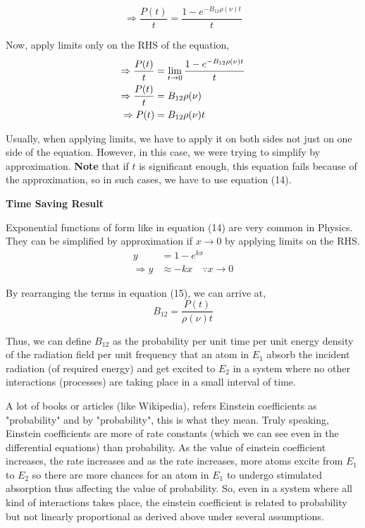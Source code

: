 \documentclass[12pt]{article}
\begin{document}
\begin{equation*}
    \Rightarrow \frac{P(t)}{t} = \frac{1 - e^{-B_{12}\rho(\nu)t}}{t}
\end{equation*} \vspace{.05cm}

Now, apply limits only on the RHS of the equation,
\begin{align}
    \Rightarrow \frac{P(t)}{t} &= \lim_{t \to 0} \frac{1 - e^{-B_{12}\rho(\nu)t}}{t} \notag \\
    \Rightarrow \frac{P(t)}{t} &= B_{12}\rho(\nu) \notag \\
    \Rightarrow P(t) &= B_{12}\rho(\nu)t
\end{align} 

Usually, when applying limits, we have to apply it on both sides not just on one side of the equation. However, in this case, we were trying to simplify by approximation. \textbf{Note} that if $t$ is significant enough, this equation fails because of the approximation, so in such cases, we have to use equation (14). \vspace{.2cm}

\begin{note}
    \textbf{Time Saving Result} \vspace{.2cm}

    Exponential functions of form like in equation (14) are very common in Physics. They can be simplified by approximation if $x \to 0$ by applying limits on the RHS.
    \begin{align*}
        y &= 1-e^{kx} \\
        \Rightarrow y & \approx -kx \quad \because x \to 0
    \end{align*}
\end{note}

By rearranging the terms in equation (15), we can arrive at,
\begin{equation}
    B_{12} = \frac{P(t)}{\rho(\nu)t}
\end{equation}

Thus, we can define $B_{12}$ as the probability per unit time per unit energy density of the radiation field per unit frequency that an atom in $E_{1}$ absorb the incident radiation (of required energy) and get excited to $E_{2}$ in a system where no other interactions (processes) are taking place in a small interval of time. \vspace{.2cm}

A lot of books or articles (like Wikipedia), refers Einstein coefficients as "probability" and by "probability", this is what they mean. Truly speaking, Einstein coefficients are more of rate constants (which we can see even in the differential equations) than probability. As the value of einstein coefficient increases, the rate increases and as the rate increases, more atoms excite from $E_{1}$ to $E_{2}$ so there are more chances for an atom in $E_{1}$ to undergo stimulated absorption thus affecting the value of probability. So, even in a system where all kind of interactions takes place, the einstein coefficient is related to probability but not linearly proportional as derived above under several assumptions.
\end{document}
